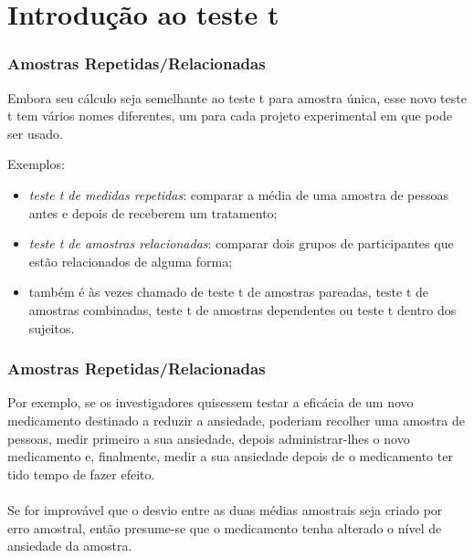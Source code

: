 \documentclass[11pt]{beamer}
\begin{document}
\section{Introdução ao teste t}
\begin{frame}
\frametitle{Amostras Repetidas/Relacionadas}
Embora seu cálculo seja semelhante ao teste t para amostra única, esse novo teste t tem vários nomes diferentes, um para cada projeto experimental em que pode ser usado. 

Exemplos:
\begin{itemize}
\item \textit{teste t de medidas repetidas}: comparar a média de uma amostra de pessoas antes e depois de receberem um tratamento;
\item \textit{teste t de amostras relacionadas}: comparar dois grupos de participantes que estão relacionados de alguma forma;
\item também é às vezes chamado de teste t de amostras pareadas, teste t de amostras combinadas, teste t de amostras dependentes ou teste t dentro dos sujeitos.
\end{itemize}

\end{frame}

\begin{frame}
\frametitle{Amostras Repetidas/Relacionadas}
Por exemplo, se os investigadores quisessem testar a eficácia de um novo medicamento destinado a reduzir a ansiedade, poderiam recolher uma amostra de pessoas, medir primeiro a sua ansiedade, depois administrar-lhes o novo medicamento e, finalmente, medir a sua ansiedade depois de o medicamento ter tido tempo de fazer efeito.\\~\\

Se for improvável que o desvio entre as duas médias amostrais seja criado por erro amostral, então presume-se que o medicamento tenha alterado o nível de ansiedade da amostra.

\end{frame}
\end{document}
